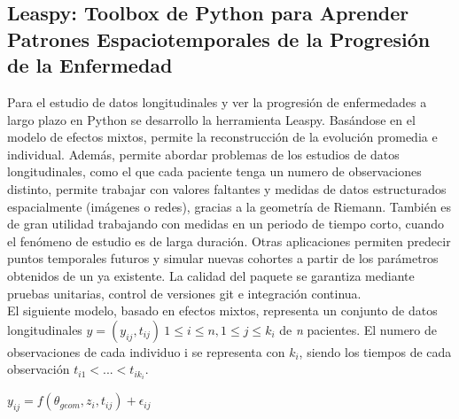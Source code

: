 \documentclass[12pt]{article}
\begin{document}
\subsection{Leaspy: Toolbox de Python para Aprender Patrones Espaciotemporales de la Progresión de la Enfermedad}

Para el estudio de datos longitudinales y ver la progresión de enfermedades a largo plazo en Python se desarrollo la herramienta Leaspy. Basándose en el modelo de efectos mixtos, permite la reconstrucción de la evolución promedia e individual. Además, permite abordar problemas de los estudios de datos longitudinales, como el que cada paciente tenga un numero de observaciones distinto, permite trabajar con valores faltantes y medidas de datos estructurados espacialmente (imágenes o redes), gracias a la geometría de Riemann. También es de gran utilidad trabajando con medidas en un periodo de tiempo corto, cuando el fenómeno de estudio es de larga duración. Otras aplicaciones permiten predecir puntos temporales futuros y simular nuevas cohortes a partir de los parámetros obtenidos de un ya existente. La calidad del paquete se garantiza mediante pruebas unitarias, control de versiones git e integración continua.\\

El siguiente modelo, basado en efectos mixtos, representa un conjunto de datos longitudinales $y=(y_{ij},t_{ij})\ 1 \leq i \le n, 1 \le j \le k_{i}​$ de \textit{n} pacientes. El numero de observaciones de cada individuo i se representa con $k_{i}$, siendo los tiempos de cada observación $t_{i1} < ... < t_{ik_{i}}$.
\begin{center}
$y_{ij} = f(\theta_{geom}, z_{i}, t_{ij} ) + \epsilon_{ij}$
\end{center}
\end{document}
